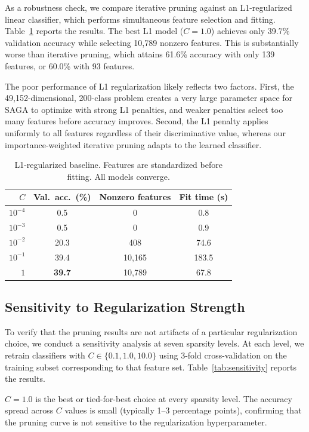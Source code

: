 As a robustness check, we compare iterative pruning against an L1-regularized linear classifier, which performs simultaneous feature selection and fitting. Table~\ref{tab:l1} reports the results. The best L1 model ($C = 1.0$) achieves only 39.7\% validation accuracy while selecting 10{,}789 nonzero features. This is substantially worse than iterative pruning, which attains 61.6\% accuracy with only 139 features, or 60.0\% with 93 features.

The poor performance of L1 regularization likely reflects two factors. First, the 49{,}152-dimensional, 200-class problem creates a very large parameter space for SAGA to optimize with strong L1 penalties, and weaker penalties select too many features before accuracy improves. Second, the L1 penalty applies uniformly to all features regardless of their discriminative value, whereas our importance-weighted iterative pruning adapts to the learned classifier.

\begin{table}[t]
\centering
\caption{L1-regularized baseline. Features are standardized before fitting. All models converge.}
\label{tab:l1}
\begin{tabular}{rccc}
\toprule
$C$ & Val.\ acc.\ (\%) & Nonzero features & Fit time (s) \\
\midrule
$10^{-4}$ & 0.5 & 0 & 0.8 \\
$10^{-3}$ & 0.5 & 0 & 0.9 \\
$10^{-2}$ & 20.3 & 408 & 74.6 \\
$10^{-1}$ & 39.4 & 10{,}165 & 183.5 \\
$1$        & \textbf{39.7} & 10{,}789 & 67.8 \\
\bottomrule
\end{tabular}
\end{table}

\subsection{Sensitivity to Regularization Strength}
\label{sec:sensitivity}

To verify that the pruning results are not artifacts of a particular regularization choice, we conduct a sensitivity analysis at seven sparsity levels. At each level, we retrain classifiers with $C \in \{0.1, 1.0, 10.0\}$ using 3-fold cross-validation on the training subset corresponding to that feature set. Table~\ref{tab:sensitivity} reports the results.

$C = 1.0$ is the best or tied-for-best choice at every sparsity level. The accuracy spread across $C$ values is small (typically 1--3 percentage points), confirming that the pruning curve is not sensitive to the regularization hyperparameter.

